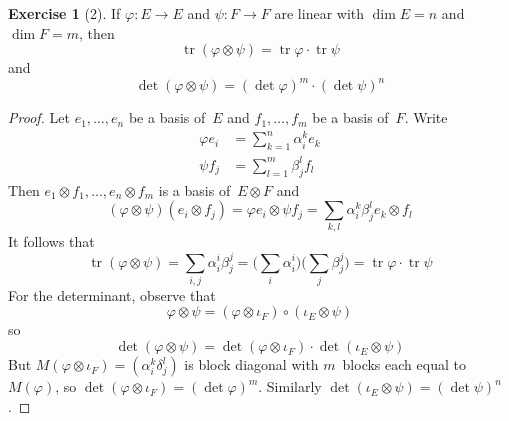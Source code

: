 \documentclass[letterpaper,12pt]{article}
\DeclareMathOperator{\tr}{tr}
\newcommand{\after}{\circ}
\newcommand{\mult}{\cdot}
\newcommand{\tprod}{\otimes}
\theoremstyle{definition}
\newtheorem*{exer}{Exercise}
\theoremstyle{remark}
\begin{document}
\begin{exer}[2]
If \(\varphi:E\to E\) and \(\psi:F\to F\) are linear with \(\dim E=n\) and \(\dim F=m\), then
\[\tr(\varphi\tprod\psi)=\tr\varphi\mult\tr\psi\]
and
\[\det(\varphi\tprod\psi)=(\det\varphi)^m\mult(\det\psi)^n\]
\end{exer}
\begin{proof}
Let \(e_1,\ldots,e_n\) be a basis of~\(E\) and \(f_1,\ldots,f_m\) be a basis of~\(F\). Write
\begin{align*}
\varphi e_i&=\sum_{k=1}^n\alpha^k_ie_k\\
\psi f_j&=\sum_{l=1}^m\beta^l_jf_l
\end{align*}
Then \(e_1\tprod f_1,\ldots,e_n\tprod f_m\) is a basis of~\(E\tprod F\) and
\[(\varphi\tprod\psi)(e_i\tprod f_j)=\varphi e_i\tprod\psi f_j=\sum_{k,l}\alpha^k_i\beta^l_je_k\tprod f_l\]
It follows that
\[\tr(\varphi\tprod\psi)=\sum_{i,j}\alpha^i_i\beta^j_j=\bigl(\sum_i\alpha^i_i\bigr)\bigl(\sum_j\beta^j_j\bigr)=\tr\varphi\mult\tr\psi\]
For the determinant, observe that
\[\varphi\tprod\psi=(\varphi\tprod\iota_F)\after(\iota_E\tprod\psi)\]
so
\[\det(\varphi\tprod\psi)=\det(\varphi\tprod\iota_F)\mult\det(\iota_E\tprod\psi)\]
But \(M(\varphi\tprod\iota_F)=(\alpha^k_i\delta^l_j)\) is block diagonal with \(m\)~blocks each equal to~\(M(\varphi)\), so \(\det(\varphi\tprod\iota_F)=(\det\varphi)^m\). Similarly \(\det(\iota_E\tprod\psi)=(\det\psi)^n\).
\end{proof}
\end{document}
